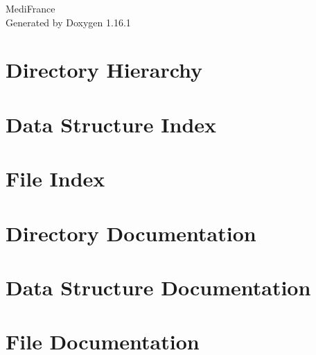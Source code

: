 \documentclass[twoside]{book}
\newcommand{\+}{\discretionary{\mbox{\scriptsize$\hookleftarrow$}}{}{}}
\newcommand{\clearemptydoublepage}{%
    \newpage{\pagestyle{empty}\cleardoublepage}%
  }
\begin{document}
  \raggedbottom
    \hypersetup{pageanchor=false,
                bookmarksnumbered=true,
                pdfencoding=unicode
               }
  \begin{titlepage}
  \vspace*{7cm}
  \begin{center}%
  {\Large Medi\+France}\\
  \vspace*{1cm}
  {\large Generated by Doxygen 1.16.1}\\
  \end{center}
  \end{titlepage}
  \clearemptydoublepage
  \tableofcontents
  \clearemptydoublepage
  \hypersetup{pageanchor=true}

\chapter{Directory Hierarchy}

\chapter{Data Structure Index}

\chapter{File Index}

\chapter{Directory Documentation}




\chapter{Data Structure Documentation}







\chapter{File Documentation}



























  \backmatter
  \newpage
  \clearemptydoublepage
  \printindex
\end{document}
